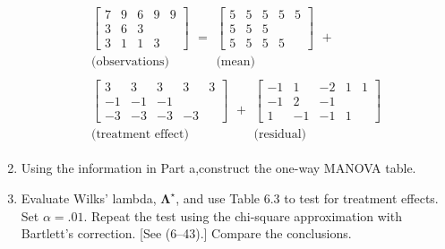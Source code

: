 \begin{enumerate}[label= (\alph*)]
    \begin{multline*}
        \begin{array}{c}
            \left[
                \begin{array}{ccccc}
                    7 & 9 & 6 & 9 & 9 \\
                    3 & 6 & 3 &   &   \\
                    3 & 1 & 1 & 3 & 
                \end{array}
            \right] \\
            \text{(observations)}
        \end{array}
        =
        \begin{array}{c}
            \left[
                \begin{array}{ccccc}
                    5 & 5 & 5 & 5 & 5 \\
                    5 & 5 & 5 &   &   \\
                    5 & 5 & 5 & 5 & 
                \end{array}
            \right] \\
            \text{(mean)}
        \end{array}
        + \\
        \begin{array}{c}
            \left[
                \begin{array}{ccccc}
                    3 &  3 &  3 &  3 & 3 \\
                    -1 & -1 & -1 &    &   \\
                    -3 & -3 & -3 & -3 & 
                \end{array}
            \right] \\
            \text{(treatment effect)}
        \end{array}
        +
        \begin{array}{c}
            \left[
                \begin{array}{ccccc}
                    -1 &  1 & -2 & 1 & 1 \\
                    -1 &  2 & -1 &   &   \\
                    1 & -1 & -1 & 1 & 
                \end{array}
            \right] \\
            \text{(residual)}
        \end{array}
    \end{multline*}

    \item Using the information in Part a,construct the one-way MANOVA table.
    
    \item Evaluate Wilks' lambda, $\bm{\Lambda}^{\star}$, and use Table 6.3 to test for treatment effects.
    Set $\alpha = .01$. Repeat the test using the chi-square approximation with Bartlett's correction.
    [See (6--43).] Compare the conclusions.
\end{enumerate}